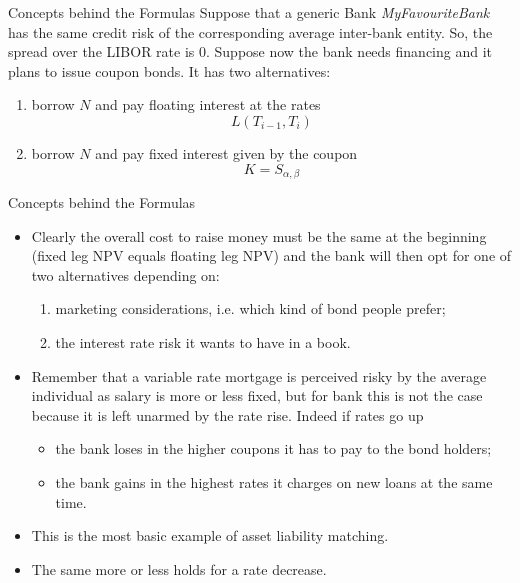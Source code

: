 \documentclass{beamer}
\begin{document}
\begin{frame}{Concepts behind the Formulas}
	Suppose that a generic Bank \emph{MyFavouriteBank} has the same credit risk of the corresponding average inter-bank entity. So, the spread over the LIBOR rate is 0. Suppose now the bank needs financing and it plans to issue coupon bonds. It has two alternatives:
	\begin{enumerate}
		\item borrow $N$ and pay floating interest at the rates
		\begin{equation*}
			L(T_{i-1},T_i)
		\end{equation*}
		\item borrow $N$ and pay fixed interest given by the coupon
		\begin{equation*}
			K = S_{\alpha,\beta}
		\end{equation*}	
	\end{enumerate}
\end{frame}

\begin{frame}{Concepts behind the Formulas}
	\begin{itemize}
		\item Clearly the overall cost to raise money must be the same at the beginning (fixed leg NPV equals floating leg NPV) and the bank will then opt for one of two alternatives depending on:
		\begin{enumerate}
			\item marketing considerations, i.e. which kind of bond people prefer;
			\item the interest rate risk it wants to have in a book.
		\end{enumerate} 
		\item Remember that a variable rate mortgage is perceived risky by the average individual as salary is more or less fixed, but for bank this is not the case because it is left unarmed by the rate rise. Indeed if rates go up
		\begin{itemize}
			\item the bank loses in the higher coupons it has to pay to the bond holders;
			\item the bank gains in the highest rates it charges on new loans at the same time.
		\end{itemize}
		\item This is the most basic example of asset liability matching.
		\item The same more or less holds for a rate decrease.%
	\end{itemize}
\end{frame}
\end{document}

